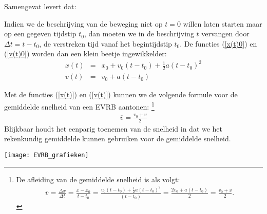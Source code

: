 \documentclass{ximera}
\begin{document}
	Samengevat levert dat:
	
	
	Indien we de beschrijving van de beweging niet op $t=0$ willen laten starten maar op een gegeven tijdstip $t_0$, dan moeten we in de beschrijving $t$ vervangen door $\Delta t= t-t_0$, de verstreken tijd vanaf het begintijdstip $t_0$. De functies (\ref{x(t)0}) en (\ref{v(t)0}) worden dan een klein beetje ingewikkelder:
	\begin{eqnarray}
	x(t)&=&x_0+v_0(t-t_0)+\frac{1}{2}a(t-t_0)^2\\
	v(t)&=&v_0+a(t-t_0)
	\end{eqnarray}
	
	Met de functies (\ref{x(t)}) en (\ref{v(t)}) kunnen we de volgende formule voor de gemiddelde snelheid van een EVRB aantonen:%
	\footnote{De afleiding van de gemiddelde snelheid is als volgt:
	\begin{eqnarray*}
	\overline{v}=\frac{\Delta x}{\Delta t}=\frac{x-x_0}{t-t_0}=\frac{v_0(t-t_0)+\frac{1}{2}a(t-t_0)^2}{(t-t_0)}=\frac{2v_0+a(t-t_0)}{2}=\frac{v_0+v}{2}.
	\end{eqnarray*}}
	\begin{eqnarray*}
	  \overline{v}=\frac{v_0+v}{2}
	\end{eqnarray*}
	Blijkbaar houdt het eenparig toenemen van de snelheid in dat we het rekenkundig gemiddelde kunnen gebruiken voor de gemiddelde snelheid.
	
	
	\begin{image}
	
	\texttt{[image: EVRB\_grafieken]}
	\end{image}
	
\end{document}
